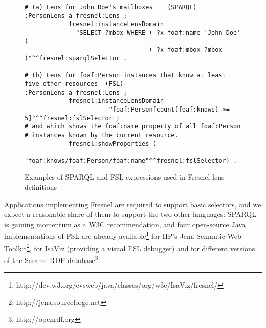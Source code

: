 \begin{figure}
\begin{scriptsize}
\begin{verbatim}
# (a) Lens for John Doe's mailboxes    (SPARQL)
:PersonLens a fresnel:Lens ;
            fresnel:instanceLensDomain
              "SELECT ?mbox WHERE ( ?x foaf:name 'John Doe' )
                                  ( ?x foaf:mbox ?mbox )"^^fresnel:sparqlSelector .

# (b) Lens for foaf:Person instances that know at least five other resources  (FSL)
:PersonLens a fresnel:Lens ;
            fresnel:instanceLensDomain
                       "foaf:Person[count(foaf:knows) >= 5]"^^fresnel:fslSelector ;
# and which shows the foaf:name property of all foaf:Person
# instances known by the current resource.
            fresnel:showProperties (
                         "foaf:knows/foaf:Person/foaf:name"^^fresnel:fslSelector) .
\end{verbatim}
\end{scriptsize}
\vspace{-1em}
\caption{Examples of SPARQL and FSL expressions used in Fresnel lens definitions}
\label{fslsparqlExample}
\vspace{-1em}
\end{figure}


Applications implementing Fresnel are required to support basic selectors, and we expect a reasonable share of them to support the two other languages: SPARQL is gaining momentum as a W3C recommendation, and four open-source Java implementations of FSL are already available\footnote{http://dev.w3.org/cvsweb/java/classes/org/w3c/IsaViz/fresnel/} for HP's Jena Semantic Web Toolkit\footnote{http://jena.sourceforge.net}, for IsaViz (providing a visual FSL debugger) and for different versions of the Sesame RDF database\footnote{http://openrdf.org}.
